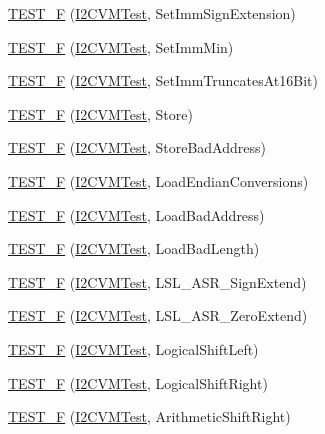 \begin{DoxyCompactItemize}
\item 
\hyperlink{group___unit_tests_gab26ddcb061179d0238954b4a4f149b3b}{T\-E\-S\-T\-\_\-\-F} (\hyperlink{class_i2_c_v_m_test}{I2\-C\-V\-M\-Test}, Set\-Imm\-Sign\-Extension)
\item 
\hyperlink{group___unit_tests_ga9d1fd34d9c33dcae7684a163688efa51}{T\-E\-S\-T\-\_\-\-F} (\hyperlink{class_i2_c_v_m_test}{I2\-C\-V\-M\-Test}, Set\-Imm\-Min)
\item 
\hyperlink{group___unit_tests_ga00fc2472f93dc16ff718689f8fbdcda2}{T\-E\-S\-T\-\_\-\-F} (\hyperlink{class_i2_c_v_m_test}{I2\-C\-V\-M\-Test}, Set\-Imm\-Truncates\-At16\-Bit)
\item 
\hyperlink{group___unit_tests_gaef630d690ed99e8cf216b0f72fdd5b23}{T\-E\-S\-T\-\_\-\-F} (\hyperlink{class_i2_c_v_m_test}{I2\-C\-V\-M\-Test}, Store)
\item 
\hyperlink{group___unit_tests_ga05800e4f670392f78853e4827e13f691}{T\-E\-S\-T\-\_\-\-F} (\hyperlink{class_i2_c_v_m_test}{I2\-C\-V\-M\-Test}, Store\-Bad\-Address)
\item 
\hyperlink{group___unit_tests_gad3289332928cfabc7cabe596aa42dd73}{T\-E\-S\-T\-\_\-\-F} (\hyperlink{class_i2_c_v_m_test}{I2\-C\-V\-M\-Test}, Load\-Endian\-Conversions)
\item 
\hyperlink{group___unit_tests_ga1126eb2ccff40800bc0d5c308004e807}{T\-E\-S\-T\-\_\-\-F} (\hyperlink{class_i2_c_v_m_test}{I2\-C\-V\-M\-Test}, Load\-Bad\-Address)
\item 
\hyperlink{group___unit_tests_gad868321881cf4fae0a9d11c16ad273a5}{T\-E\-S\-T\-\_\-\-F} (\hyperlink{class_i2_c_v_m_test}{I2\-C\-V\-M\-Test}, Load\-Bad\-Length)
\item 
\hyperlink{group___unit_tests_ga4b43e2486591995a9870ffe8b97ff0af}{T\-E\-S\-T\-\_\-\-F} (\hyperlink{class_i2_c_v_m_test}{I2\-C\-V\-M\-Test}, L\-S\-L\-\_\-\-A\-S\-R\-\_\-\-Sign\-Extend)
\item 
\hyperlink{group___unit_tests_gaceb71a0ba1b5cb9e7dddf188c05833cb}{T\-E\-S\-T\-\_\-\-F} (\hyperlink{class_i2_c_v_m_test}{I2\-C\-V\-M\-Test}, L\-S\-L\-\_\-\-A\-S\-R\-\_\-\-Zero\-Extend)
\item 
\hyperlink{group___unit_tests_ga727b6097a9d881f2333caf01add8f616}{T\-E\-S\-T\-\_\-\-F} (\hyperlink{class_i2_c_v_m_test}{I2\-C\-V\-M\-Test}, Logical\-Shift\-Left)
\item 
\hyperlink{group___unit_tests_ga3e5c552462de21f6f63035ab3dab4408}{T\-E\-S\-T\-\_\-\-F} (\hyperlink{class_i2_c_v_m_test}{I2\-C\-V\-M\-Test}, Logical\-Shift\-Right)
\item 
\hyperlink{group___unit_tests_ga5ddec420dc153ad632f5e0e3c85c7336}{T\-E\-S\-T\-\_\-\-F} (\hyperlink{class_i2_c_v_m_test}{I2\-C\-V\-M\-Test}, Arithmetic\-Shift\-Right)

\end{DoxyCompactItemize}
